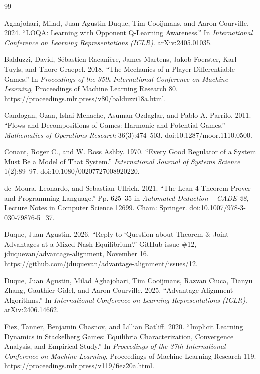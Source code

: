 \documentclass[11pt]{article}
\theoremstyle{remark}
\begin{document}
\begin{thebibliography}{99}
\setlength{\itemsep}{2pt}

 Aghajohari, Milad, Juan Agustin Duque, Tim Cooijmans, and Aaron Courville. 2024. ``LOQA: Learning with Opponent Q-Learning Awareness.'' In \emph{International Conference on Learning Representations (ICLR)}. arXiv:2405.01035.

 Balduzzi, David, S\'ebastien Racani\`ere, James Martens, Jakob Foerster, Karl Tuyls, and Thore Graepel. 2018. ``The Mechanics of n-Player Differentiable Games.'' In \emph{Proceedings of the 35th International Conference on Machine Learning}, Proceedings of Machine Learning Research 80. \url{https://proceedings.mlr.press/v80/balduzzi18a.html}.

 Candogan, Ozan, Ishai Menache, Asuman Ozdaglar, and Pablo A. Parrilo. 2011. ``Flows and Decompositions of Games: Harmonic and Potential Games.'' \emph{Mathematics of Operations Research} 36(3):474--503. doi:10.1287/moor.1110.0500.

 Conant, Roger C., and W. Ross Ashby. 1970. ``Every Good Regulator of a System Must Be a Model of That System.'' \emph{International Journal of Systems Science} 1(2):89--97. doi:10.1080/00207727008920220.

 de~Moura, Leonardo, and Sebastian Ullrich. 2021. ``The Lean 4 Theorem Prover and Programming Language.'' Pp. 625--35 in \emph{Automated Deduction -- CADE 28}, Lecture Notes in Computer Science 12699. Cham: Springer. doi:10.1007/978-3-030-79876-5\_37.

 Duque, Juan Agustin. 2026. ``Reply to `Question about Theorem 3: Joint Advantages at a Mixed Nash Equilibrium'.'' GitHub issue \#12, jduquevan/advantage-alignment, November 16. \url{https://github.com/jduquevan/advantage-alignment/issues/12}.

 Duque, Juan Agustin, Milad Aghajohari, Tim Cooijmans, Razvan Ciuca, Tianyu Zhang, Gauthier Gidel, and Aaron Courville. 2025. ``Advantage Alignment Algorithms.'' In \emph{International Conference on Learning Representations (ICLR)}. arXiv:2406.14662.

 Fiez, Tanner, Benjamin Chasnov, and Lillian Ratliff. 2020. ``Implicit Learning Dynamics in Stackelberg Games: Equilibria Characterization, Convergence Analysis, and Empirical Study.'' In \emph{Proceedings of the 37th International Conference on Machine Learning}, Proceedings of Machine Learning Research 119. \url{https://proceedings.mlr.press/v119/fiez20a.html}.


\end{thebibliography}
\end{document}
